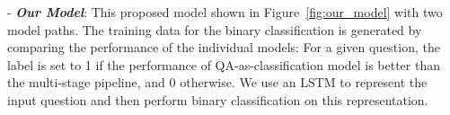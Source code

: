 \documentclass[10pt,twocolumn,letterpaper]{article}
\begin{document}
\noindent - \textit{\textbf{Our Model}}:  This proposed model shown in Figure~\ref{fig:our_model} with two model paths.
The training data for the binary classification is generated by comparing the performance of the individual models: For a given question, the label is set to 1 if the performance of QA-as-classification model is better than the multi-stage pipeline, and 0 otherwise. 
       We use an LSTM to represent the input question and then perform binary classification on this representation.


\end{document}
